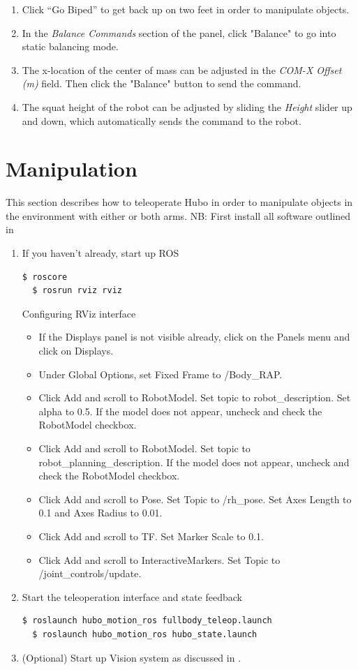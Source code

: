 \documentclass[letterpaper, 10 pt]{report}
\begin{document}
\begin{enumerate}
    \item Click ``Go Biped'' to get back up on two feet in order to manipulate objects.
    \item In the \textit{Balance Commands} section of the panel, click "Balance" to go into static balancing mode.
    \item The x-location of the center of mass can be adjusted in the \textit{COM-X Offset (m)} field. Then click the "Balance" button to send the command.
    \item The squat height of the robot can be adjusted by sliding the \textit{Height} slider up and down, which automatically sends the command to the robot.
  \end{enumerate}
  
\pagebreak
\section{Manipulation}
This section describes how to teleoperate Hubo in order to manipulate objects in the environment with either or both arms.
NB: First install all software outlined in 
\begin{enumerate}
  \item If you haven't already, start up ROS
  \begin{lstlisting}[language=bash]
  $ roscore
  $ rosrun rviz rviz
  \end{lstlisting}
  Configuring RViz interface
  \begin{itemize}
    \item If the Displays panel is not visible already, click on the Panels menu and click on Displays.
    \item Under Global Options, set Fixed Frame to /Body\_RAP.
    \item Click Add and scroll to RobotModel. Set topic to robot\_description. Set alpha to 0.5. If the model does not appear, uncheck and check the RobotModel checkbox.
    \item Click Add and scroll to RobotModel. Set topic to robot\_planning\_description. If the model does not appear, uncheck and check the RobotModel checkbox.
    \item Click Add and scroll to Pose. Set Topic to /rh\_pose. Set Axes Length to 0.1 and Axes Radius to 0.01.
    \item Click Add and scroll to TF. Set Marker Scale to 0.1.
    \item Click Add and scroll to InteractiveMarkers. Set Topic to /joint\_controls/update.
  \end{itemize}
  \item Start the teleoperation interface and state feedback
  \begin{lstlisting}[language=bash]
  $ roslaunch hubo_motion_ros fullbody_teleop.launch
  $ roslaunch hubo_motion_ros hubo_state.launch
  \end{lstlisting}
  \item (Optional) Start up Vision system as discussed in .
\end{enumerate}
\end{document}
